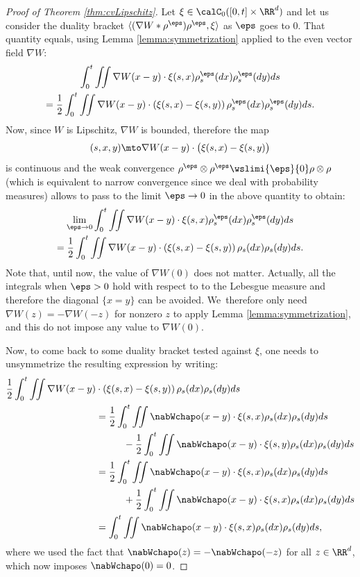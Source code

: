 \begin{proof}[Proof of Theorem \ref{thm:cvLipschitz}]
Let $\xi \in \calC_0([0,t] \times \RR^d)$ and let us consider the duality bracket $\langle(\nabla W * \rho^\eps) \rho^\eps, \xi\rangle$ as $\eps$ goes to 0. That quantity equals, using Lemma \ref{lemma:symmetrization} applied to the even vector field $\nabla W$:
\begin{multline}\label{eq:passlimNLterm:1}
\int_0^t \iint \nabla W(x - y) \cdot \xi(s, x) \rho^\eps_s(dx) \rho^\eps_s(dy) ds \\
= \frac 12 \int_0^t \iint \nabla W(x - y) \cdot \left( \xi(s, x) - \xi(s,y) \right) \rho^\eps_s(dx) \rho^\eps_s(dy) ds.
\end{multline}
Now, since $W$ is Lipschitz, $\nabla W$ is bounded, therefore the map
\[
(s,x,y) \mto \nabla W(x - y) \cdot \big( \xi(s, x) - \xi(s,y) \big)
\] is continuous and the weak convergence $\rho^\eps \otimes \rho^\eps \wslimi{\eps}{0} \rho \otimes \rho$ (which is equivalent to narrow convergence since we deal with probability measures) allows to pass to the limit $\eps \to 0$ in the above quantity to obtain:\vspace*{-5pt}
\begin{multline}\label{eq:passlimNLterm:2}
\lim_{\eps \to 0} \int_0^t \iint \nabla W(x - y) \cdot \xi(s, x) \rho^\eps_s(dx) \rho^\eps_s(dy) ds \\
= \frac 12 \int_0^t \iint \nabla W(x - y) \cdot \left( \xi(s, x) - \xi(s,y) \right) \rho_s(dx) \rho_s(dy) ds.
\end{multline}
Note that, until now, the value of $\nabla W(0)$ does not matter. Actually, all the integrals when $\eps > 0$ hold with respect to to the Lebesgue measure and therefore the diagonal $\{x = y\}$ can be avoided. We~therefore only need $\nabla W(z) = - \nabla W(-z)$ for nonzero $z$ to apply Lemma \ref{lemma:symmetrization}, and this do not impose any value to $\nabla W(0)$.

Now, to come back to some duality bracket tested against $\xi$, one needs to unsymmetrize the resulting expression by writing:
\begin{equation}\label{eq:passlimNLterm:3}
\begin{aligned}
\frac 12 \int_0^t \iint \nabla W(x - y) &{}\cdot \left( \xi(s, x) - \xi(s,y) \right) \rho_s(dx) \rho_s(dy) ds \\
& = \frac 12 \int_0^t \iint \nabWchapo(x - y) \cdot \xi(s, x) \rho_s(dx) \rho_s(dy) ds \\
& \hspace*{1cm} - \frac 12 \int_0^t \iint \nabWchapo(x - y) \cdot \xi(s, y) \rho_s(dx) \rho_s(dy) ds \\
& = \frac 12 \int_0^t \iint \nabWchapo(x - y) \cdot \xi(s, x) \rho_s(dx) \rho_s(dy) ds \\
& \hspace*{1cm}+ \frac 12 \int_0^t \iint \nabWchapo(x - y) \cdot \xi(s, x) \rho_s(dx) \rho_s(dy) ds \\
& = \int_0^t \iint \nabWchapo(x - y) \cdot \xi(s, x) \rho_s(dx) \rho_s(dy) ds,
\end{aligned}
\end{equation}
where we used the fact that $\nabWchapo(z) = - \nabWchapo(-z)$ for all $z \in \RR^d$, which now imposes $\nabWchapo(0) = 0$.


\end{proof}
